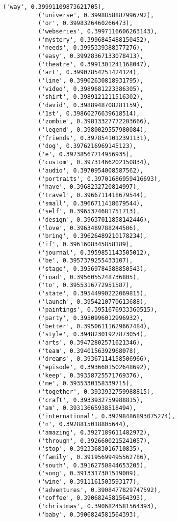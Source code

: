 \documentclass[11pt]{article}
\begin{document}
\begin{Verbatim}[commandchars=\\\{\}]
          ('way', 0.39991109873621705),
          ('universe', 0.3998858887996792),
          ('or', 0.3998326460266473),
          ('webseries', 0.3997116606263143),
          ('mystery', 0.3996845488150452),
          ('needs', 0.3995339388377276),
          ('easy', 0.39928367133078413),
          ('theatre', 0.3991301241168047),
          ('art', 0.39907854251424124),
          ('line', 0.39902630818931795),
          ('video', 0.3989681223386305),
          ('shirt', 0.3989121211516302),
          ('david', 0.3988948708281159),
          ('1st', 0.39860276639618514),
          ('zombie', 0.39813327772203666),
          ('legend', 0.3980029557980084),
          ('friends', 0.3978541012391131),
          ('dog', 0.3976216969145123),
          ('e', 0.39738567714956935),
          ('custom', 0.39731466202150834),
          ('audio', 0.3970954008587562),
          ('portraits', 0.39701686959416693),
          ('have', 0.3968232720814997),
          ('travel', 0.3966711418679544),
          ('small', 0.3966711418679544),
          ('self', 0.3965374681751713),
          ('design', 0.39637011858142446),
          ('love', 0.3963489788244506),
          ('bring', 0.39626489210178234),
          ('if', 0.3961608345858189),
          ('journal', 0.3959851143505012),
          ('be', 0.3957379255433107),
          ('stage', 0.39569784588850543),
          ('road', 0.3956055248736805),
          ('to', 0.3955316772951587),
          ('state', 0.39544990222069815),
          ('launch', 0.3954210770613688),
          ('paintings', 0.3951676933360515),
          ('party', 0.3950996012996932),
          ('better', 0.39506111629667484),
          ('style', 0.39482301927873054),
          ('arts', 0.39472802571621346),
          ('team', 0.3940156392968078),
          ('dreams', 0.39367114158506966),
          ('episode', 0.3936601502648692),
          ('keep', 0.39358725571769376),
          ('me', 0.3935330158339715),
          ('together', 0.3933932759988815),
          ('craft', 0.3933932759988815),
          ('am', 0.39313665938518494),
          ('international', 0.39298486893075274),
          ('n', 0.3928815018805644),
          ('amazing', 0.3927189611482972),
          ('through', 0.3926600215241057),
          ('stop', 0.39233683016710835),
          ('family', 0.39195699495562786),
          ('south', 0.39162750844653205),
          ('song', 0.3913317301519009),
          ('wine', 0.3911161503593177),
          ('adventures', 0.3908477829747592),
          ('coffee', 0.3906824581564393),
          ('christmas', 0.3906824581564393),
          ('baby', 0.3906824581564393),

\end{Verbatim}
\end{document}
